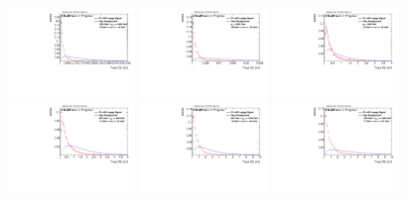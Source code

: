 \begin{figure}
\includegraphics[width=0.3\textwidth]{sascha_input/Appendix/Distributions/w/distributions/beta2/h_normal_tj_C2_2_bin5.pdf} \hspace{1mm}
\includegraphics[width=0.3\textwidth]{sascha_input/Appendix/Distributions/w/distributions/beta2/h_normal_tj_C2_2_bin6.pdf} 
\bigskip
\includegraphics[width=0.3\textwidth]{sascha_input/Appendix/Distributions/w/distributions/beta2/h_normal_tj_D2_2_bin1.pdf} \hspace{1mm}
\includegraphics[width=0.3\textwidth]{sascha_input/Appendix/Distributions/w/distributions/beta2/h_normal_tj_D2_2_bin2.pdf} \hspace{1mm}
\includegraphics[width=0.3\textwidth]{sascha_input/Appendix/Distributions/w/distributions/beta2/h_normal_tj_D2_2_bin3.pdf} 
\bigskip
\includegraphics[width=0.3\textwidth]{sascha_input/Appendix/Distributions/w/distributions/beta2/h_normal_tj_D2_2_bin4.pdf} \hspace{1mm}

\end{figure}

